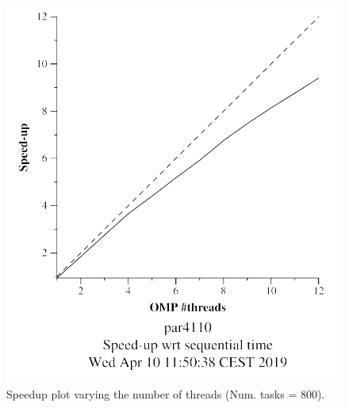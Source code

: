 \documentclass[12pt, a4paper]{article}
\begin{document}
\begin{figure}[H]
\begin{minipage}[b]{0.4\linewidth}
  \includegraphics[scale=0.5]{./mandel-omp-10000-strong-omp-3-800-speedup}
  \caption{Speedup plot varying the number of threads (Num. tasks = 800).}
  \label{fig:mandel-omp-10000-strong-omp-3-800-speedup}
\end{minipage}
\end{figure}
\end{document}
